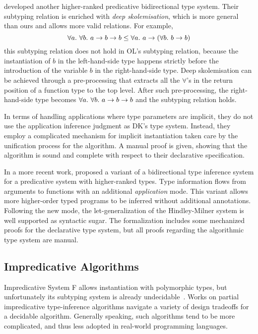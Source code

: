 \citet{jones2007practical} developed another higher-ranked predicative bidirectional type system.
Their subtyping relation is enriched with \emph{deep skolemisation},
which is more general than ours and allows more valid relations.
For example,
$$\all{\all[b] a \to b \to b} \le \all a \to (\all[b] b \to b)$$
this subtyping relation does not hold in OL's subtyping relation,
because the instantiation of $b$ in the left-hand-side type
happens strictly before the introduction of
the variable $b$ in the right-hand-side type.
Deep skolemisation can be achieved through
a pre-processing that extracts all the $\forall$'s
in the return position of a function type to the top level.
After such pre-processing, the right-hand-side type becomes
$\all {\all[b] a \to b \to b}$ and the subtyping relation holds.

In terms of handling applications where type parameters are implicit,
they do not use the application inference judgment as DK's type system.
Instead, they employ a complicated mechanism for implicit instantiation
taken care by the unification process for the algorithm.
A manual proof is given, showing that the algorithm is sound and
complete with respect to their declarative specification.

In a more recent work, \citet{xie2018letarguments} proposed a variant of a
bidirectional type inference system for a predicative system with higher-ranked types.
Type information flows from arguments to
functions with an additional \emph{application} mode. This variant 
allows more higher-order typed programs to be inferred without additional annotations.
Following the new mode, the let-generalization of the Hindley-Milner system
is well supported as syntactic sugar. The formalization includes some
mechanized proofs for the declarative type system, but all proofs regarding
the algorithmic type system are manual.

\subsection{Impredicative Algorithms}

Impredicative System F allows instantiation with polymorphic types,
but unfortunately its subtyping system is already undecidable~\citep{chrzaszcz1998poly}.
Works on partial impredicative type-inference algorithms
navigate a variety of design tradeoffs for a decidable algorithm.
Generally speaking, such algorithms tend to be more complicated,
and thus less adopted in real-world programming languages.

